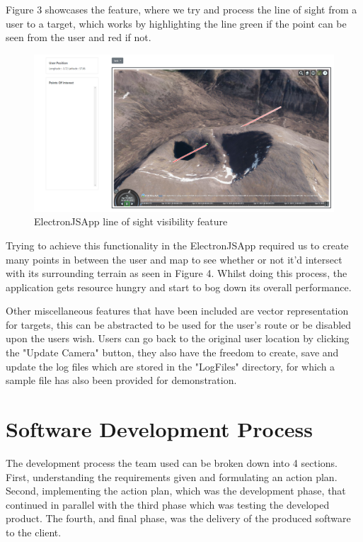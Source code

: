 \documentclass{l3proj}
\begin{document}
Figure 3 showcases the feature, where we try and process the line of sight from a user to a target, which works by highlighting the line green if the point can be seen from the user and red if not.

\begin{figure}[H]
    \caption{ElectronJSApp line of sight visibility feature}
    \includegraphics[width=\textwidth]{ElectronJSLOS.jpg}
\end{figure}

Trying to achieve this functionality in the ElectronJSApp required us to create many points in between the user and map to see whether or not it'd intersect with its surrounding terrain as seen in Figure 4. Whilst doing this process, the application gets resource hungry and start to bog down its overall performance. 

Other miscellaneous features that have been included are vector representation for targets, this can be abstracted to be used for the user's route or be disabled upon the users wish. Users can go back to the original user location by clicking the "Update Camera" button, they also have the freedom to create, save and update the log files which are stored in the "LogFiles" directory, for which a sample file has also been provided for demonstration.

\section{Software Development Process}

The development process the team used can be broken down into 4 sections. First, understanding the requirements given and formulating an action plan. Second, implementing the action plan, which was the development phase, that continued in parallel with the third phase which was testing the developed product. The fourth, and final phase, was the delivery of the produced software to the client.
\end{document}
